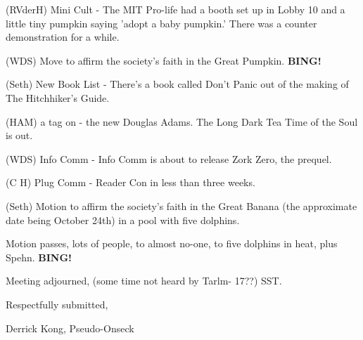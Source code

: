 \documentclass[12pt]{article}
\newcommand{\bing}{{\bf BING!} }
\begin{document}
(RVderH) Mini Cult - The MIT Pro-life had a booth set up in Lobby 10 and a little tiny pumpkin saying 'adopt a baby pumpkin.' There was a counter demonstration for a while.

(WDS) Move to affirm the society's faith in the Great Pumpkin. \bing

(Seth) New Book List - There's a book called Don't Panic out of the making of The Hitchhiker's Guide.

(HAM) a tag on - the new Douglas Adams. The Long Dark Tea Time of the Soul is out.

(WDS) Info Comm - Info Comm is about to release Zork Zero, the prequel.

(C H) Plug Comm - Reader Con in less than three weeks.

(Seth) Motion to affirm the society's faith in the Great Banana (the approximate date being October 24th) in a pool with five dolphins.

Motion passes, lots of people, to almost no-one, to five dolphins in heat, plus Spehn. \bing

\vspace{12pt}

\noindent
Meeting adjourned, (some time not heard by Tarlm- 17??) SST.

\vspace{18pt}

\centerline{Respectfully submitted,}
\centerline{Derrick Kong, Pseudo-Onseck}
\end{document}
